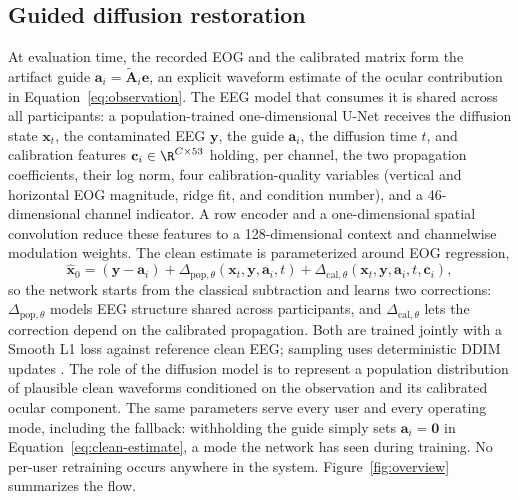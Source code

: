 \subsection{Guided diffusion restoration}
\label{sec:method-diffusion}

At evaluation time, the recorded EOG and the calibrated matrix form the artifact guide $\mathbf{a}_i=\widetilde{\mathbf{A}}_i\mathbf{e}$, an explicit waveform estimate of the ocular contribution in Equation~\ref{eq:observation}. The EEG model that consumes it is shared across all participants: a population-trained one-dimensional U-Net receives the diffusion state $\mathbf{x}_t$, the contaminated EEG $\mathbf{y}$, the guide $\mathbf{a}_i$, the diffusion time $t$, and calibration features $\mathbf{c}_i\in\R^{C\times 53}$ holding, per channel, the two propagation coefficients, their log norm, four calibration-quality variables (vertical and horizontal EOG magnitude, ridge fit, and condition number), and a 46-dimensional channel indicator. A row encoder and a one-dimensional spatial convolution reduce these features to a 128-dimensional context and channelwise modulation weights. The clean estimate is parameterized around EOG regression,
\begin{equation}
 \widehat{\mathbf{x}}_0=
 (\mathbf{y}-\mathbf{a}_i)
 +\Delta_{\mathrm{pop},\theta}(\mathbf{x}_t,\mathbf{y},\mathbf{a}_i,t)
 +\Delta_{\mathrm{cal},\theta}(\mathbf{x}_t,\mathbf{y},\mathbf{a}_i,t,
 \mathbf{c}_i),
 \label{eq:clean-estimate}
\end{equation}
so the network starts from the classical subtraction and learns two corrections: $\Delta_{\mathrm{pop},\theta}$ models EEG structure shared across participants, and $\Delta_{\mathrm{cal},\theta}$ lets the correction depend on the calibrated propagation. Both are trained jointly with a Smooth L1 loss against reference clean EEG; sampling uses deterministic DDIM updates \cite{song2020ddim}. The role of the diffusion model is to represent a population distribution of plausible clean waveforms conditioned on the observation and its calibrated ocular component. The same parameters serve every user and every operating mode, including the fallback: withholding the guide simply sets $\mathbf{a}_i=\mathbf{0}$ in Equation~\ref{eq:clean-estimate}, a mode the network has seen during training. No per-user retraining occurs anywhere in the system. Figure~\ref{fig:overview} summarizes the flow.

